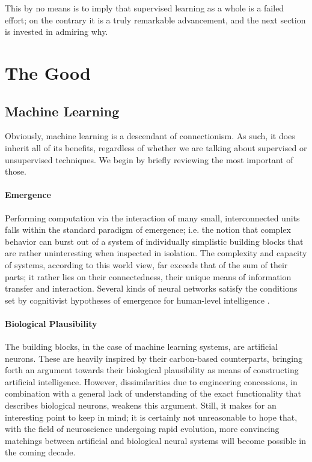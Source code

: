 \documentclass[]{article}
\begin{document}
This by no means is to imply that supervised learning as a whole is a failed effort; on the contrary it is a truly remarkable advancement, and the next section is invested in admiring why.

\section{The Good}

\subsection{Machine Learning}
Obviously, machine learning is a descendant of connectionism. As such, it does inherit all of its benefits, regardless of whether we are talking about supervised or unsupervised techniques. We begin by briefly reviewing the most important of those.

\paragraph{Emergence}
Performing computation via the interaction of many small, interconnected units falls within the standard paradigm of emergence; i.e. the notion that complex behavior can burst out of a system of individually simplistic building blocks that are rather uninteresting when inspected in isolation. The complexity and capacity of systems, according to this world view, far exceeds that of the sum of their parts; it rather lies on their connectedness, their unique means of information transfer and interaction. Several kinds of neural networks satisfy the conditions set by cognitivist hypotheses of emergence for human-level intelligence \cite{Penna2016, Hopfield1982}.


\paragraph{Biological Plausibility}
The building blocks, in the case of machine learning systems, are artificial neurons. These are heavily inspired by their carbon-based counterparts, bringing forth an argument towards their biological plausibility as means of constructing artificial intelligence. However, dissimilarities due to engineering concessions, in combination with a general lack of understanding of the exact functionality that describes biological neurons, weakens this argument. Still, it makes for an interesting point to keep in mind; it is certainly not unreasonable to hope that, with the field of neuroscience undergoing rapid evolution, more convincing matchings between artificial and biological neural systems will become possible in the coming decade.
\end{document}
